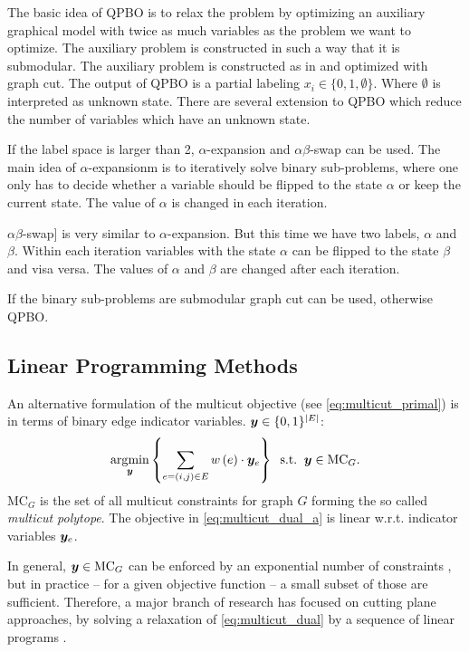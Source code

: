 The basic idea of QPBO is to relax the problem by optimizing an auxiliary graphical
model with twice as much variables as the problem we want to optimize. The
auxiliary problem is constructed in such a way that it is submodular. The
auxiliary problem is constructed as in \cite{rother_2007_cvpr} and optimized with graph cut. 
The output of QPBO
is a partial labeling $x_i \in \{ 0,1,\emptyset \}$. Where $\emptyset$ is interpreted as unknown state. There are several
extension to QPBO which reduce the number
of variables which have an unknown state.


If the label space is larger than 2, $\alpha$-expansion and $\alpha \beta$-swap \cite{boykov_2001_pami} can be used.
The main idea of $\alpha$-expansionm is to iteratively
solve binary sub-problems, where one only has to decide whether a variable should be
flipped to the state $\alpha$ or keep the current state. The value of $\alpha$ is changed in each iteration.

$\alpha \beta$-swap] is very similar  to  $\alpha$-expansion.
But this time we have two labels, $\alpha$ and $\beta$. Within each iteration variables
with the state $\alpha$ can be flipped to the state $\beta$ and visa versa. The values of $\alpha$ and $\beta$
are changed after each iteration.

If the binary sub-problems are submodular graph cut can be used, otherwise QPBO.



\subsection{Linear Programming Methods}



An alternative formulation of the multicut objective (see \cref{eq:multicut_primal})
is in terms of binary edge indicator variables.
$\boldsymbol y \in \{0,1\}^{| E |}$:
\begin{align}
\argmin_{\y}
%
\left\{
    \sum_{e=(i,j) \in E} \w \left(e\right) \cdot \y_{e}
\right\}%
%
\;\;\text{s.t.}\;\;\y \in \MC_G.
\label{eq:multicut_dual_a}
\end{align}
%
%
$\text{MC}_G$ is the set of all multicut
constraints \cite{chopra_1993_mp} for graph $G$ forming
the so called \emph{multicut polytope}.
The objective in \cref{eq:multicut_dual_a}
is linear w.r.t. indicator variables $\boldsymbol y_{e}$.

In general,
$\boldsymbol y \in \text{MC}_G$ can be enforced by an exponential number of
constraints \cite{chopra_1993_mp}, but in practice
-- for a given objective function --
a small subset of those are sufficient.
Therefore, a major branch of research has focused 
on cutting plane approaches,
by solving a relaxation of \eqref{eq:multicut_dual}
by a sequence of linear programs 
\cite{kim_2011_nips,kim_2012_ip,kappes_2013_arxiv,finley_2005_ml}.









